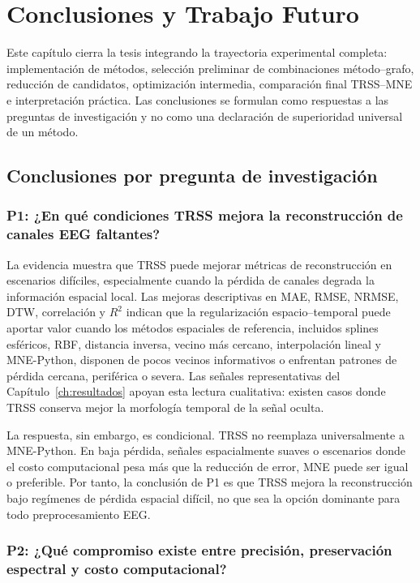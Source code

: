 \chapter{Conclusiones y Trabajo Futuro}
\label{ch:conclusiones}

Este capítulo cierra la tesis integrando la trayectoria experimental completa: implementación de métodos, selección preliminar de combinaciones método--grafo, reducción de candidatos, optimización intermedia, comparación final TRSS--MNE e interpretación práctica. Las conclusiones se formulan como respuestas a las preguntas de investigación y no como una declaración de superioridad universal de un método.

\section{Conclusiones por pregunta de investigación}

\subsection*{P1: ¿En qué condiciones TRSS mejora la reconstrucción de canales EEG faltantes?}

La evidencia muestra que TRSS puede mejorar métricas de reconstrucción en escenarios difíciles, especialmente cuando la pérdida de canales degrada la información espacial local. Las mejoras descriptivas en MAE, RMSE, NRMSE, DTW, correlación y $R^2$ indican que la regularización espacio--temporal puede aportar valor cuando los métodos espaciales de referencia, incluidos splines esféricos, RBF, distancia inversa, vecino más cercano, interpolación lineal y MNE-Python, disponen de pocos vecinos informativos o enfrentan patrones de pérdida cercana, periférica o severa. Las señales representativas del Capítulo~\ref{ch:resultados} apoyan esta lectura cualitativa: existen casos donde TRSS conserva mejor la morfología temporal de la señal oculta.

La respuesta, sin embargo, es condicional. TRSS no reemplaza universalmente a MNE-Python. En baja pérdida, señales espacialmente suaves o escenarios donde el costo computacional pesa más que la reducción de error, MNE puede ser igual o preferible. Por tanto, la conclusión de P1 es que TRSS mejora la reconstrucción bajo regímenes de pérdida espacial difícil, no que sea la opción dominante para todo preprocesamiento EEG.

\subsection*{P2: ¿Qué compromiso existe entre precisión, preservación espectral y costo computacional?}

